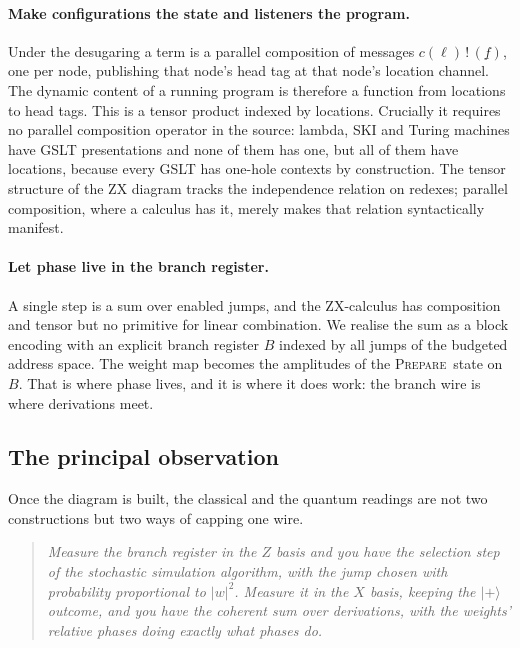 \documentclass[11pt]{article}
\theoremstyle{definition}
\theoremstyle{plain}
\newcommand{\out}[2]{#1\,!\,(#2)}
\newcommand{\PREP}{\textsc{Prepare}}
\newcommand{\ket}[1]{| #1 \rangle}
\begin{document}
\paragraph{Make configurations the state and listeners the program.} Under the desugaring a
term is a parallel composition of messages $\out{c(\ell)}{\underline{f}}$, one per node,
publishing that node's head tag at that node's location channel. The dynamic content of a
running program is therefore a function from locations to head tags. This is a tensor product
indexed by locations. Crucially it requires no parallel composition operator in the source:
lambda, SKI and Turing machines have GSLT presentations and none of them has one, but all of
them have locations, because every GSLT has one-hole contexts by construction. The tensor
structure of the ZX diagram tracks the independence relation on redexes; parallel composition,
where a calculus has it, merely makes that relation syntactically manifest.

\paragraph{Let phase live in the branch register.} A single step is a sum over enabled jumps,
and the ZX-calculus has composition and tensor but no primitive for linear combination. We
realise the sum as a block encoding with an explicit branch register $B$ indexed by all jumps
of the budgeted address space. The weight map becomes the amplitudes of the \PREP\ state on
$B$. That is where phase lives, and it is where it does work: the branch wire is where
derivations meet.

\subsection{The principal observation}

Once the diagram is built, the classical and the quantum readings are not two constructions
but two ways of capping one wire.

\begin{quote}
\emph{Measure the branch register in the $Z$ basis and you have the selection step of the
stochastic simulation algorithm, with the jump chosen with probability proportional to
$|w|^2$. Measure it in the $X$ basis, keeping the $\ket{+}$ outcome, and you have the coherent
sum over derivations, with the weights' relative phases doing exactly what phases do.}
\end{quote}
\end{document}
